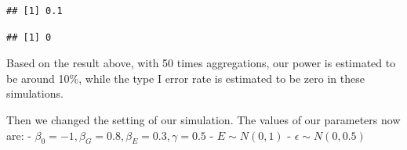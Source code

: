 \documentclass[
]{article}
\newenvironment{Shaded}{\begin{snugshade}}{\end{snugshade}}
\newcommand{\CommentTok}[1]{\textcolor[rgb]{0.56,0.35,0.01}{\textit{#1}}}
\newcommand{\DataTypeTok}[1]{\textcolor[rgb]{0.13,0.29,0.53}{#1}}
\newcommand{\DecValTok}[1]{\textcolor[rgb]{0.00,0.00,0.81}{#1}}
\newcommand{\KeywordTok}[1]{\textcolor[rgb]{0.13,0.29,0.53}{\textbf{#1}}}
\newcommand{\NormalTok}[1]{#1}
\newcommand{\OperatorTok}[1]{\textcolor[rgb]{0.81,0.36,0.00}{\textbf{#1}}}
\newcommand{\StringTok}[1]{\textcolor[rgb]{0.31,0.60,0.02}{#1}}
\begin{document}
\begin{verbatim}
## [1] 0.1
\end{verbatim}

\begin{Shaded}
\end{Shaded}

\begin{verbatim}
## [1] 0
\end{verbatim}

Based on the result above, with 50 times aggregations, our power is
estimated to be around 10\%, while the type I error rate is estimated to
be zero in these simulations.

Then we changed the setting of our simulation. The values of our
parameters now are: -
\(\beta_0= -1, \beta_G=0.8, \beta_E= 0.3,\gamma=0.5\) -
\(E \sim N(0,1)\) - \(\epsilon \sim N(0,0.5)\)
\end{document}
